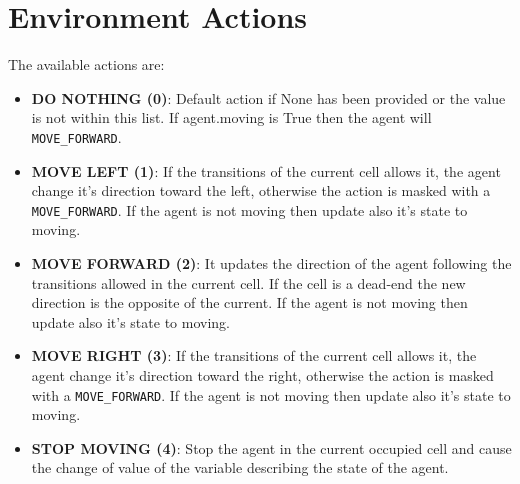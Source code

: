 \section{Environment Actions}
\label{sec:envActions}
The available actions are:
\begin{itemize}
\item \textbf{DO NOTHING (0)}: Default action if None has been provided or the value is not within this list. If agent.moving is True then the agent will \texttt{MOVE\_FORWARD}.

\item \textbf{MOVE LEFT (1)}: If the transitions of the current cell allows it, the agent change it's direction toward the left, otherwise the action is masked with a \texttt{MOVE\_FORWARD}. If the agent is not moving then update also it's state to moving.

\item \textbf{MOVE FORWARD (2)}: It updates the direction of the agent following the transitions allowed in the current cell. If the cell is a dead-end the new direction is the opposite of the current. If the agent is not moving then update also it's state to moving.

\item \textbf{MOVE RIGHT (3)}: If the transitions of the current cell allows it, the agent change it's direction toward the right, otherwise the action is masked with a \texttt{MOVE\_FORWARD}. If the agent is not moving then update also it's state to moving.

\item \textbf{STOP MOVING (4)}: Stop the agent in the current occupied cell and cause the change of value of the variable describing the state of the agent.

\end{itemize}
